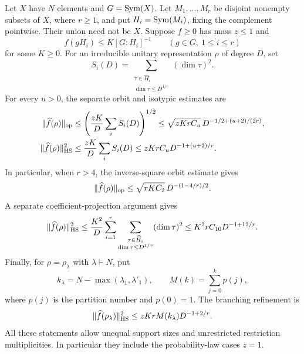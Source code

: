 \begin{proposition}
\label{shear:prop:disjoint-transfer}
Let \(X\) have \(N\) elements and \(G=\operatorname{Sym}(X)\). Let
\(M_1,\ldots,M_r\) be disjoint nonempty subsets of \(X\), where \(r\ge1\),
and put \(H_i=\operatorname{Sym}(M_i)\), fixing the complement pointwise.
Their union need not be \(X\). Suppose \(f\ge0\) has mass \(z\le1\) and
\[
 f(gH_i)\le K[G:H_i]^{-1}\qquad(g\in G,\ 1\le i\le r)
\]
for some \(K\ge0\). For an irreducible unitary representation \(\rho\)
of degree \(D\), set
\[
 S_i(D)=
 \sum_{\substack{\tau\in\widehat H_i\\ \dim\tau\le D^{1/r}}}
       (\dim\tau)^2.
\]
For every \(u>0\), the separate orbit and isotypic estimates are
\begin{align}
 \|\widehat f(\rho)\|_{\mathrm{op}}
 &\le \left(\frac{zK}{D}\sum_iS_i(D)\right)^{1/2}
 \le \sqrt{zKrC_u}\,D^{-1/2+(u+2)/(2r)},
 \label{shear:eq:noncovering-orbit-general}\\
 \|\widehat f(\rho)\|_{\mathrm{HS}}^2
 &\le \frac{zK}{D}\sum_iS_i(D)
 \le zKrC_uD^{-1+(u+2)/r}.
 \label{shear:eq:noncovering-isotypic-general}
\end{align}
In particular, when \(r>4\), the inverse-square orbit estimate gives
\begin{equation}
 \|\widehat f(\rho)\|_{\mathrm{op}}
 \le\sqrt{rKC_2}\,D^{-(1-4/r)/2}.
 \label{shear:eq:orbit-bound}
\end{equation}
A separate coefficient-projection argument gives
\begin{equation}
 \|\widehat f(\rho)\|_{\mathrm{HS}}^2
 \le\frac{K^2}{D}\sum_{i=1}^r
       \sum_{\substack{\tau\in\widehat H_i\\
                            \dim\tau\le D^{1/r}}}(\dim\tau)^2
 \le K^2rC_{10}D^{-1+12/r}.
 \label{shear:eq:hs-general}
\end{equation}
Finally, for \(\rho=\rho_\lambda\) with \(\lambda\vdash N\), put
\[
 k_\lambda=N-\max(\lambda_1,\lambda'_1),
 \qquad M(k)=\sum_{j=0}^k p(j),
\]
where \(p(j)\) is the partition number and \(p(0)=1\). The branching
refinement is
\begin{equation}
 \|\widehat f(\rho_\lambda)\|_{\mathrm{HS}}^2
 \le zKrM(k_\lambda)D^{-1+2/r}.
 \label{shear:eq:hs-branching}
\end{equation}
All these statements allow unequal support sizes and unrestricted
restriction multiplicities. In particular they include the
probability-law cases \(z=1\).
\end{proposition}



